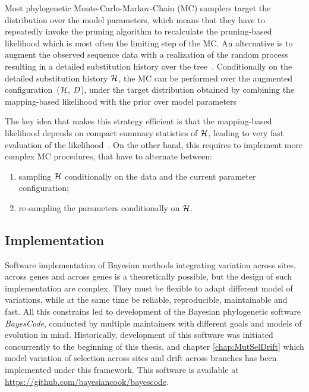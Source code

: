 Most phylogenetic Monte-Carlo-Markov-Chain (\acrshort{MC}) samplers target the distribution over the model parameters, which means that they have to repeatedly invoke the pruning algorithm to recalculate the pruning-based \gls{likelihood} which is most often the limiting step of the \acrshort{MC}.
An alternative is to augment the observed sequence data with a realization of the random process resulting in a detailed \gls{substitution} history over the tree~\citep{Nielsen2002,Rodrigue2008}.
Conditionally on the detailed \gls{substitution} history $\mathcal{H}$, the \acrshort{MC} can be performed over the augmented configuration~($\mathcal{H}$, $D$), under the target distribution obtained by combining the mapping-based \gls{likelihood} with the \gls{prior} over model parameters

The key idea that makes this strategy efficient is that the mapping-based \gls{likelihood} depends on compact summary statistics of $\mathcal{H}$, leading to very fast evaluation of the \gls{likelihood}~\citep{Irvahn2014,Davydov2016}.
On the other hand, this requires to implement more complex \acrshort{MC} procedures, that have to alternate between:
\begin{enumerate}
	\item sampling $\mathcal{H}$ conditionally on the data and the current parameter configuration;
	\item re-sampling the parameters conditionally on $\mathcal{H}$.
\end{enumerate}

\subsection{Implementation}

Software implementation of Bayesian methods integrating variation across sites, across genes and across genes is a theoretically possible, but the design of such implementation are complex.
They must be flexible to adapt different model of variations, while at the same time be reliable, reproducible, maintainable and fast.
All this constrains led to development of the Bayesian phylogenetic software \textit{BayesCode}, conducted by multiple maintainers with different goals and models of evolution in mind.
Historically, development of this software was initiated concurrently to the beginning of this thesis, and chapter \ref{chap:MutSelDrift} which model variation of selection across sites and drift across branches has been implemented under this framework.
This software is available at \url{https://github.com/bayesiancook/bayescode}.


